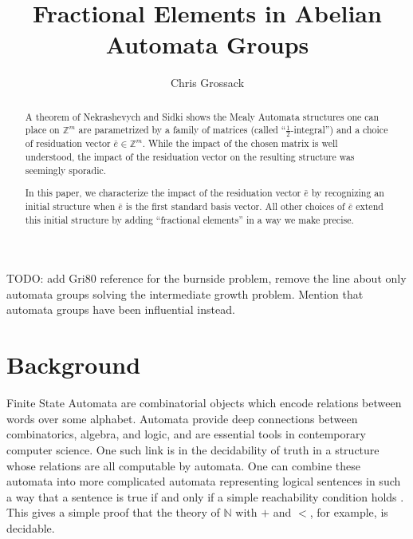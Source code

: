 \documentclass[final]{ws-ijac}
\title{Fractional Elements in Abelian Automata Groups}
\author{Chris Grossack}
\newcommand{\Z}{\mathbb{Z}}
\newcommand{\2}{\textbf{2}}
\newcommand{\e}{\bar{e}}
\begin{document}
\maketitle

\begin{abstract}
  A theorem of Nekrashevych and Sidki shows the Mealy Automata
  structures one can place on $\Z^m$ are parametrized by a family of
  matrices (called ``$\frac{1}{2}$-integral'') and a choice of 
  residuation vector $\e \in \Z^m$. While the impact of the chosen 
  matrix is well understood, the impact of the residuation vector on the
  resulting structure was seemingly sporadic. 

  In this paper, we characterize the impact of the residuation vector $\e$
  by recognizing an initial structure when $\e$ is the first standard basis 
  vector. All other choices of $\e$ extend this initial structure by adding
  ``fractional elements'' in a way we make precise. 

\end{abstract}

TODO: add Gri80 reference for the burnside problem, remove the line about 
only automata groups solving the intermediate growth problem. Mention that
automata groups have been influential instead.

\section{Background}
Finite State Automata are combinatorial objects which encode relations 
between words over some alphabet. Automata provide deep connections between
combinatorics, algebra, and logic, and are essential tools in contemporary 
computer science. One such link is in the decidability of truth in a structure
whose relations are all computable by automata. One can combine these automata 
into more complicated automata representing logical sentences in such a way 
that a sentence is true if and only if a simple reachability condition holds
\cite{Brny07:automatic_structures}. This gives a simple proof that the theory 
of $\mathbb{N}$ with $+$ and $<$, for example, is decidable.
\end{document}
